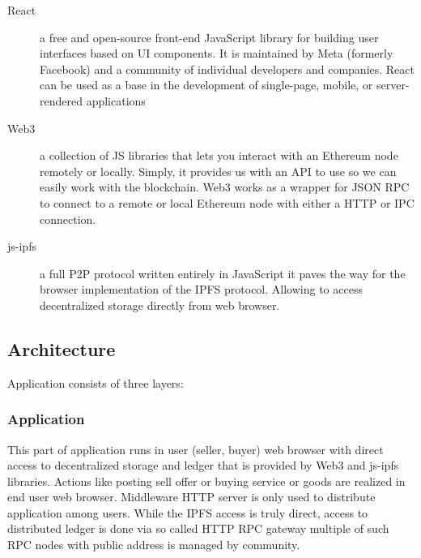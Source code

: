 \documentclass[journal]{IEEEtran} %
\begin{document}
        \begin{description}
        
            \item[React] a free and open-source front-end JavaScript library for building user interfaces based on UI components. It is maintained by Meta (formerly Facebook) and a community of individual developers and companies. React can be used as a base in the development of single-page, mobile, or server-rendered applications\\
        
            \item[Web3] a collection of JS libraries that lets you interact with an Ethereum node remotely or locally. Simply, it provides us with an API to use so we can easily work with the blockchain. Web3 works as a wrapper for JSON RPC to connect to a remote or local Ethereum node with either a HTTP or IPC connection.\\
            
            \item[js-ipfs] a full P2P protocol written entirely in JavaScript it paves the way for the browser implementation of the IPFS protocol. Allowing to access decentralized storage directly from web browser.\\
            
        \end{description}
        
    \subsection{Architecture}
        Application consists of three layers:\\
    
        \subsubsection{Application}
            This part of application runs in user (seller, buyer) web browser with direct access to decentralized storage and ledger that is provided by Web3 and js-ipfs libraries. Actions like posting sell offer or buying service or goods are realized in end user web browser. Middleware HTTP server is only used to distribute application among users. While the IPFS access is truly direct, access to distributed ledger is done via so called HTTP RPC gateway multiple of such RPC nodes with public address is managed by community.\\
            
\end{document}
